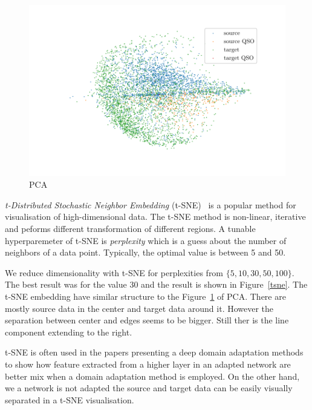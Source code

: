 \begin{figure}
	\includegraphics[width=\textwidth]{img/pca.pdf}
	\caption{PCA}
	\label{pca}
\end{figure}

\textit{t-Distributed Stochastic Neighbor Embedding} (t-SNE)~\cite{maaten2008, wattenberg2016} is a popular method for visualisation of high-dimensional data.
The t-SNE method is non-linear, iterative
and peforms different transformation of different regions.
A tunable hyperparemeter of t-SNE is \textit{perplexity}
which is a guess about the number of neighbors of a data point.
Typically, the optimal value is between 5 and 50.

We reduce dimensionality with t-SNE for perplexities from \(\{5, 10, 30, 50, 100\}\).
The best result was for the value 30
and the result is shown in Figure~\ref{tsne}.
The t-SNE embedding have similar structure to the Figure~\ref{pca} of PCA.
There are mostly source data in the center and target data around it.
However the separation between center and edges seems to be bigger.
Still ther is the line component extending to the right.

t-SNE is often used in the papers presenting a deep domain adaptation methods
to show how feature extracted from a higher layer in an adapted network
are better mix when a domain adaptation method is employed.
On the other hand, we a network is not adapted the source and target data
can be easily visually separated in a t-SNE visualisation.

